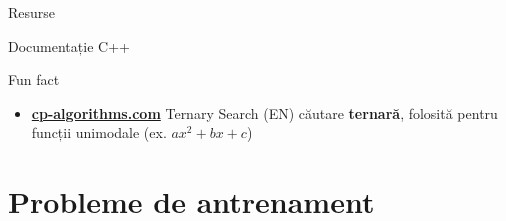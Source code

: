 \documentclass{beamer}
\begin{document}
\begin{frame}{Resurse}
\begin{block}{Documentație C++}
\begin{itemize}
    \end{itemize}
  \end{block}
  \vspace{-6pt}
  \begin{block}{Fun fact}
    \begin{itemize}\footnotesize\itemsep0pt
      \item \href{https://cp-algorithms.com/num_methods/ternary_search.html}{\textbf{cp-algorithms.com}} \textemdash{} Ternary Search (EN) \textemdash{} căutare \textbf{ternară}, folosită pentru funcții unimodale (ex. $ax^2+bx+c$)
    \end{itemize}
  \end{block}
\end{frame}

\section{Probleme de antrenament}
\end{document}
